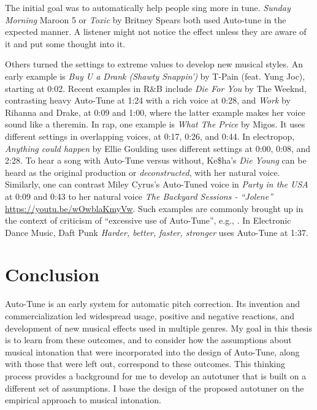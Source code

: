 The initial goal was to automatically help people sing more in tune. \textit{Sunday Morning} Maroon 5 or \textit{Toxic} by Britney Spears both used Auto-tune in the expected manner. A listener might not notice the effect unless they are aware of it and put some thought into it.

Others turned the settings to extreme values to develop new musical styles. An early example is \textit{Buy U a Drank (Shawty Snappin')} by T-Pain (feat. Yung Joc), starting at 0:02. Recent examples in R\&B include \textit{Die For You} by The Weeknd, contrasting heavy Auto-Tune at 1:24 with a rich voice at 0:28, and \textit{Work} by Rihanna and Drake, at 0:09 and 1:00, where the latter example makes her voice sound like a theremin. In rap, one example is \textit{What The Price} by Migos. It uses different settings in overlapping voices, at 0:17, 0:26, and 0:44. In electropop, \textit{Anything could happen} by Ellie Goulding uses different settings at 0:00, 0:08, and 2:28. To hear a song with Auto-Tune versus without, Ke\$ha's \textit{Die Young} can be heard as the original production or \textit{deconstructed}, with her natural voice. Similarly, one can contrast Miley Cyrus's Auto-Tuned voice in \textit{Party in the USA} at 0:09 and 0:43 to her natural voice \textit{The Backyard Sessions - ``Jolene''} \url{https://youtu.be/wOwblaKmyVw}. Such examples are commonly brought up in the context of criticism of ``excessive use of Auto-Tune'', e.g., \cite{katz2014}. In Electronic Dance Music, Daft Punk \textit{Harder, better, faster, stronger} uses Auto-Tune at 1:37. 

\section{Conclusion}
Auto-Tune is an early system for automatic pitch correction. Its invention and commercialization led widespread usage, positive and negative reactions, and development of new musical effects used in multiple genres. My goal in this thesis is to learn from these outcomes, and to consider how the assumptions about musical intonation that were incorporated into the design of Auto-Tune, along with those that were left out, correspond to these outcomes. This thinking process provides a background for me to develop an autotuner that is built on a different set of assumptions. I base the design of the proposed autotuner on the empirical approach to musical intonation.

